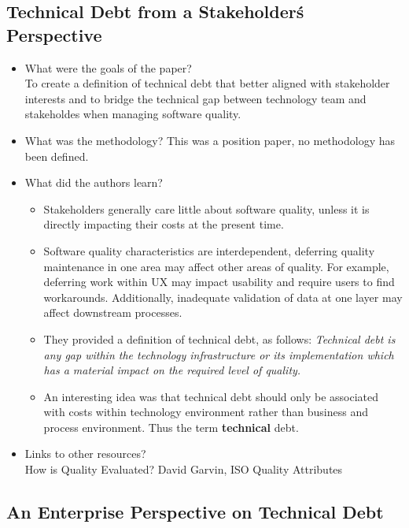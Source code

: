 \documentclass{mprop}
\begin{document}
\subsection{Technical Debt from a Stakeholder\'s Perspective} \cite{Theodoropoulos2011}

\begin{itemize}
	\item What were the goals of the paper? \\
		To create a definition of technical debt that better aligned with stakeholder interests and to bridge the technical gap between technology team and stakeholdes when managing software quality.
	\item What was the methodology?
		This was a position paper, no methodology has been defined.
	\item What did the authors learn?
		\begin{itemize}
			\item Stakeholders generally care little about software quality, unless it is directly impacting their costs at the present time.
			\item Software quality characteristics are interdependent, deferring quality maintenance in one area may affect other areas of quality. For example, deferring work within UX may impact usability and require users to find workarounds. Additionally, inadequate validation of data at one layer may affect downstream processes.
			\item They provided a definition of technical debt, as follows: \textit{Technical debt is any gap within the technology infrastructure or its implementation which has a material impact on the required level of quality.}
			\item An interesting idea was that technical debt should only be associated with costs within technology environment rather than business and process environment. Thus the term \textbf{technical} debt. 
			\end{itemize}
	\item Links to other resources? \\
		How is Quality Evaluated? David Garvin, ISO Quality Attributes
\end{itemize}

\subsection{An Enterprise Perspective on Technical Debt} \cite{Klinger2011}
\end{document}
